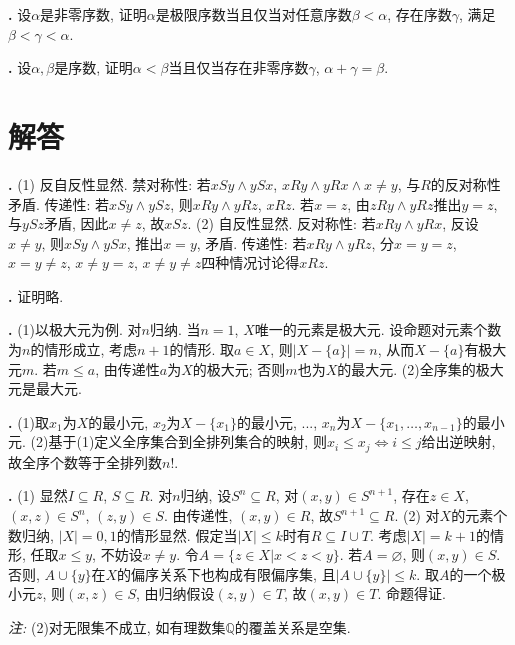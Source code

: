 \par \textbf{\theprobpar .} 设$\alpha$是非零序数, 证明$\alpha$是极限序数当且仅当对任意序数$\beta<\alpha$, 存在序数$\gamma$, 满足$\beta<\gamma<\alpha$. 

\par \textbf{\theprobpar .} \cite{NST}设$\alpha,\beta$是序数, 证明$\alpha<\beta$当且仅当存在非零序数$\gamma$, $\alpha+\gamma=\beta$. 

\section*{解答}

\par \textbf{\thesolpar .} (1) 反自反性显然. 禁对称性: 若$xSy\land ySx$, $xRy \land yRx \land x\neq y$, 与$R$的反对称性矛盾. 传递性: 若$xSy\land ySz$, 则$xRy \land yRz$, $xRz$. 若$x=z$, 由$zRy \land yRz$推出$y=z$, 与$ySz$矛盾, 因此$x\neq z$, 故$xSz$. (2) 自反性显然. 反对称性: 若$xRy \land yRx$, 反设$x\neq y$, 则$xSy \land ySx$, 推出$x=y$, 矛盾. 传递性: 若$xRy \land yRz$, 分$x=y=z$, $x=y\neq z$, $x\neq y=z$, $x\neq y\neq z$四种情况讨论得$xRz$. 

\par \textbf{\thesolpar .} 证明略. 

\par \textbf{\thesolpar .} (1)以极大元为例. 对$n$归纳. 当$n=1$, $X$唯一的元素是极大元. 设命题对元素个数为$n$的情形成立, 考虑$n+1$的情形. 取$a\in X$, 则$|X-\{a\}|=n$, 从而$X-\{a\}$有极大元$m$. 若$m\le a$, 由传递性$a$为$X$的极大元; 否则$m$也为$X$的最大元. (2)全序集的极大元是最大元.  

\par \textbf{\thesolpar .} (1)取$x_1$为$X$的最小元, $x_2$为$X-\{x_1\}$的最小元, ..., $x_n$为$X-\{x_1,\dots, x_{n-1}\}$的最小元. (2)基于(1)定义全序集合到全排列集合的映射, 则$x_i\le x_j \iff i\le j$给出逆映射, 故全序个数等于全排列数$n!$. 

\par \textbf{\thesolpar .} (1) 显然$I\subseteq R$, $S\subseteq R$. 对$n$归纳, 设$S^n\subseteq R$, 对$(x,y)\in S^{n+1}$, 存在$z\in X$, $(x,z)\in S^n$, $(z,y)\in S$. 由传递性, $(x,y)\in R$, 故$S^{n+1}\subseteq R$. (2) 对$X$的元素个数归纳, $|X|=0,1$的情形显然. 假定当$|X|\le k$时有$R\subseteq I\cup T$. 考虑$|X|=k+1$的情形, 任取$x\le y$, 不妨设$x\neq y$. 令$A=\{z\in X\vert x<z<y\}$. 若$A=\varnothing$, 则$(x,y)\in S$. 否则, $A\cup \{y\}$在$X$的偏序关系下也构成有限偏序集, 且$|A\cup \{y\}|\le k$. 取$A$的一个极小元$z$, 则$(x,z)\in S$, 由归纳假设$(z,y)\in T$, 故$(x,y)\in T$. 命题得证. 
\par \emph{注:} (2)对无限集不成立, 如有理数集$\mathbb{Q}$的覆盖关系是空集. 

